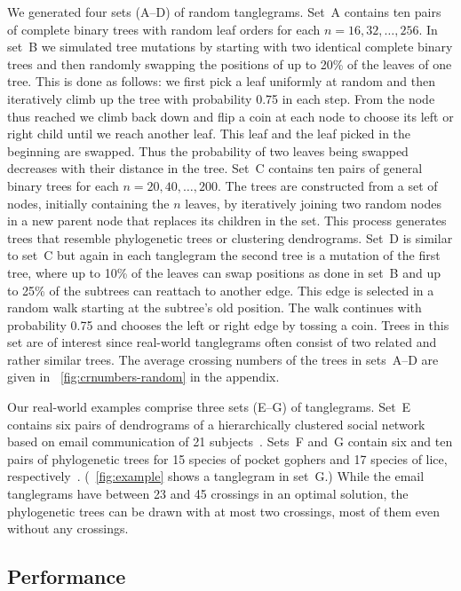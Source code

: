 \documentclass[runningheads,a4paper]{llncs}
\begin{document}
We generated four sets (A--D) of random tanglegrams. Set~A contains
ten pairs of complete binary trees with random leaf orders for each
$n = 16, 32, \ldots, 256$.  In set~B we simulated tree mutations by
starting with two identical complete binary trees and then randomly
swapping the positions of up to 20\% of the leaves of one tree. This
is done as follows: we first pick a leaf uniformly at random and
then iteratively climb up the tree with probability 0.75 in each
step. From the node thus reached we climb back down and flip a coin
at each node to choose its left or right child until we reach
another leaf. This leaf and the leaf picked in the beginning are
swapped.  Thus the probability of two leaves being swapped decreases
with their distance in the tree. Set~C contains ten pairs of general
binary trees for each $n = 20, 40, \ldots, 200$. The trees are
constructed from a set of nodes, initially containing the $n$
leaves, by iteratively joining two random nodes in a new parent node
that replaces its children in the set. This process generates trees
that resemble phylogenetic trees or clustering dendrograms. Set~D is
similar to set~C but again in each tanglegram the second tree is a
mutation of the first tree, where up to 10\% of the leaves can swap
positions as done in set~B and up to 25\% of the subtrees can
reattach to another edge.  This edge is selected in a random walk
starting at the subtree's old position. The walk continues with
probability 0.75 and chooses the left or right edge by tossing a
coin.  Trees in this set are of interest since real-world
tanglegrams often consist of two related and rather similar trees. The
average crossing numbers of the trees in sets~A--D are given in
\figurename~\ref{fig:crnumbers-random} in the appendix. 

Our real-world examples comprise three sets (E--G) of
tanglegrams. Set~E contains six pairs of dendrograms of a
hierarchically clustered social network based on email communication
of 21 subjects~\cite{ggw-lvavl-08}. Sets~F and~G contain six and ten
pairs of phylogenetic trees for 15 species of pocket gophers and 17
species of lice, respectively~\cite{hsvsdn-drmec-94}. 
(\figurename~\ref{fig:example} shows a tanglegram in set~G.)
While the email tanglegrams have between 23 and 45 crossings
in an optimal solution, the phylogenetic trees can be drawn with at
most two crossings, most of them even without any crossings.

\subsection{Performance}
\end{document}
